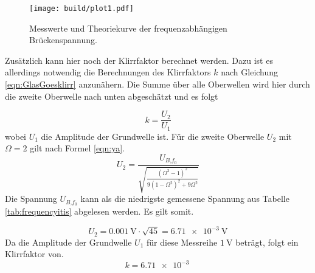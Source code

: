 \begin{figure}
    \centering
    \texttt{[image: build/plot1.pdf]}
    \caption{Messwerte und Theoriekurve der frequenzabhängigen Brückenspannung.} 
    \label{fig:plot1}
\end{figure}
\begin{flushleft}
Zusätzlich kann hier noch der Klirrfaktor berechnet werden. Dazu ist es allerdings notwendig die Berechnungen des Klirrfaktors $k$ nach Gleichung \eqref{eqn:GlasGoesklirr} anzunähern. 
Die Summe über alle Oberwellen wird hier durch die zweite Oberwelle nach unten abgeschätzt und es folgt
\end{flushleft}
\begin{equation*}
k = \frac{U_{2}}{U_{1}}
\end{equation*}
wobei $U_{1}$ die Amplitude der Grundwelle ist. Für die zweite Oberwelle $U_{2}$ mit $\Omega = 2$ gilt nach Formel \eqref{eqn:ya}.
\begin{equation*}
U_{2} = \frac{U_{B\text{,}{f_{0}}  }}{\sqrt{\frac{(\Omega^2 - 1)^{2}}{9(1- \Omega^2)^{2} + 9 \Omega^2}}} 
\end{equation*}
Die Spannung $U_{B\text{,}{f_{0}}}$ kann als die niedrigste gemessene Spannung aus Tabelle \ref{tab:frequencyitis} abgelesen werden. Es gilt somit.

\begin{equation*}
    U_{2} = \SI{0.001}{\volt} \cdot \sqrt{45} = \SI{6.71e-3}{\volt}
\end{equation*}
Da die Amplitude der Grundwelle $U_{1}$ für diese Messreihe $\SI{1}{\volt}$ beträgt, folgt ein Klirrfaktor von.
\begin{equation}
k = \SI{6.71e-3}{}
\end{equation}
